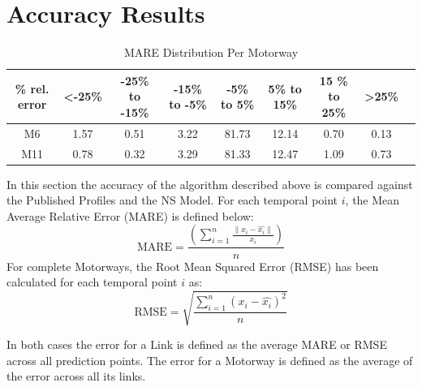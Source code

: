 \documentclass[letterpaper, 10 pt, conference]{ieeeconf}  %
\begin{document}
\section{Accuracy Results}
\begin{table}[bp]
	\caption{MARE Distribution Per Motorway}
	\centering
	\begin{center}
		\begin{tabular}{|C|C|C|C|C|C|C|C|C|}
			\hline
			\textbf{\% rel. error}&{\textless -25\%}&{-25\%\textbf{ to }-15\%}&{-15\%\textbf{ to }-5\%}&{-5\%\textbf{ to }5\%}&{5\%\textbf{ to }15\%}&{15 \%\textbf{ to }25\%}&{\textgreater 25\%}\\
			\hline
			M6& 1.57& 0.51& 3.22& 81.73& 12.14& 0.70& 0.13\\
			\hline
			M11& 0.78& 0.32& 3.29& 81.33& 12.47& 1.09& 0.73\\
			\hline
		\end{tabular}
		\label{mapeglobal}
	\end{center}
\end{table}
  
In this section the accuracy of the algorithm described above is compared against the Published Profiles and the NS Model. 
For each temporal point $i$, the Mean Average Relative Error (MARE) is defined below:
\begin{equation}
\textrm{MARE} =\frac{ \left( \sum_{i=1}^{n} \frac{\|x_i - \hat{x_i}\|}{x_i}\right)}{n}
\end{equation}
For complete Motorways, the Root Mean Squared Error (RMSE) has been calculated for each temporal point $i$ as:
\begin{equation}
\textrm{RMSE} = \sqrt{\frac{\sum_{i=1}^{n} (x_i - \hat{x_i})^2}{n}}
\end{equation}

In both cases the error for a Link is defined as the average MARE or RMSE across all prediction points.
The error for a Motorway is defined as the average of the error across all its links.


\end{document}

